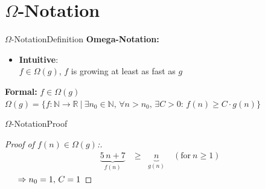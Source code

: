 
\section{\texorpdfstring{$\Omega$}{Omega}-Notation}

\begin{frame}{$\Omega$-Notation}{Definition}
  \textbf{Omega-Notation:}
  \begin{itemize}
    \item
      \textbf{Intuitive}:\\
      $f \in \Omega(g)$, $f$ is growing at least as fast as $g$
  \end{itemize}
 	\begin{block}{\textbf{Formal:} $f \in \Omega(g)$}
    \begin{math}
      \Omega(g) = \lbrace f: \mathbb{N} \to \mathbb{R} ~ | ~
        \exists n_0 \in \mathbb{N}, \, \forall n > n_0, \, \exists C > 0: \,
        f(n) \geq C \cdot g(n)\rbrace
    \end{math}
 	\end{block}
\end{frame}


\begin{frame}{$\Omega$-Notation}{Proof}
  \begin{proof}[Proof of $f(n) \in \Omega(g)$:]
    \begin{eqnarray*}
      &\underbrace{5 \, n + 7}_{f(n)} &\geq \;\; \underbrace{n}_{g(n)} 
      \hspace{1em} (\text{for} ~ n \geq 1)
    \end{eqnarray*}
    $\hspace{1.5em} \Rightarrow n_0 = 1, \, C = 1$ \qedhere
  \end{proof}
\end{frame}


